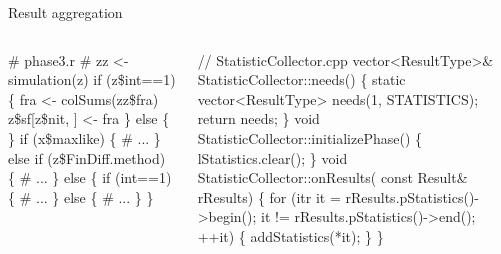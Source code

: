 \documentclass[]{beamer}                                                %
\def\scriptsize{\fontsize{7pt}{8pt}\selectfont}
\begin{document}
\begin{frame}[fragile,t]{Result aggregation}                            %
  \def\fNeed{1}
  \def\fInitialize{2}
  \def\fResult{3}
  \vfill
  \begin{columns}
    \begin{semiverbatim}\scriptsize
# phase3.r
# zz <- simulation(z)
if (z\$int==1) \{
  fra <- colSums(zz\$fra)
  z\$sf[z\$nit, ] <- fra
\} else \{
\}
if (x\$maxlike) \{ # ...
\} else if (z\$FinDiff.method) \{ # ...
\} else \{
  if (int==1) \{ # ...
  \} else \{ # ...
  \}
\}
    \end{semiverbatim}%

    \begin{semiverbatim}\scriptsize
// StatisticCollector.cpp
vector<ResultType>& StatisticCollector::\alert<\fNeed>{needs}() \{
static vector<ResultType> needs(1, \alert<\fNeed>{STATISTICS});
  return needs;
\}
void StatisticCollector::\alert<\fInitialize>{initializePhase}() \{
  \alert<\fInitialize>{lStatistics.clear();}
\}
void StatisticCollector::\alert<\fResult>{onResults}(
    const Result& rResults) \{
  for (itr it = rResults.pStatistics()->begin();
      it != rResults.pStatistics()->end(); ++it) \{
    \alert<\fResult>{addStatistics(*it);}
  \}
\}
    \end{semiverbatim}
  \end{columns}
  \vfill



\end{frame}
\end{document}
